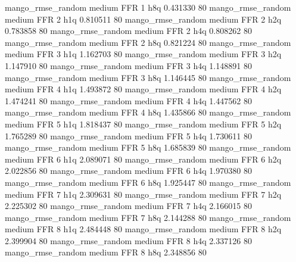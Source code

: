 mango_rmse_random     medium      FFR                 1                  h8q  0.431330 80
mango_rmse_random     medium      FFR                 2                  h1q  0.810511 80
mango_rmse_random     medium      FFR                 2                  h2q  0.783858 80
mango_rmse_random     medium      FFR                 2                  h4q  0.808262 80
mango_rmse_random     medium      FFR                 2                  h8q  0.821224 80
mango_rmse_random     medium      FFR                 3                  h1q  1.162703 80
mango_rmse_random     medium      FFR                 3                  h2q  1.147910 80
mango_rmse_random     medium      FFR                 3                  h4q  1.148891 80
mango_rmse_random     medium      FFR                 3                  h8q  1.146445 80
mango_rmse_random     medium      FFR                 4                  h1q  1.493872 80
mango_rmse_random     medium      FFR                 4                  h2q  1.474241 80
mango_rmse_random     medium      FFR                 4                  h4q  1.447562 80
mango_rmse_random     medium      FFR                 4                  h8q  1.435866 80
mango_rmse_random     medium      FFR                 5                  h1q  1.818437 80
mango_rmse_random     medium      FFR                 5                  h2q  1.765289 80
mango_rmse_random     medium      FFR                 5                  h4q  1.730611 80
mango_rmse_random     medium      FFR                 5                  h8q  1.685839 80
mango_rmse_random     medium      FFR                 6                  h1q  2.089071 80
mango_rmse_random     medium      FFR                 6                  h2q  2.022856 80
mango_rmse_random     medium      FFR                 6                  h4q  1.970380 80
mango_rmse_random     medium      FFR                 6                  h8q  1.925447 80
mango_rmse_random     medium      FFR                 7                  h1q  2.309631 80
mango_rmse_random     medium      FFR                 7                  h2q  2.225302 80
mango_rmse_random     medium      FFR                 7                  h4q  2.166015 80
mango_rmse_random     medium      FFR                 7                  h8q  2.144288 80
mango_rmse_random     medium      FFR                 8                  h1q  2.484448 80
mango_rmse_random     medium      FFR                 8                  h2q  2.399904 80
mango_rmse_random     medium      FFR                 8                  h4q  2.337126 80
mango_rmse_random     medium      FFR                 8                  h8q  2.348856 80
